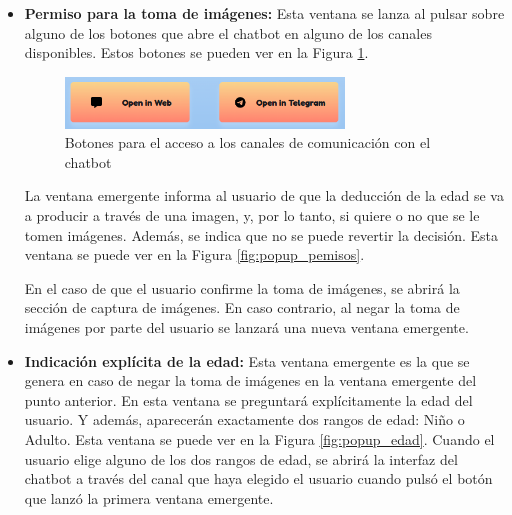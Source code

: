 \begin{itemize}
\item \textbf{Permiso para la toma de imágenes:} Esta ventana se lanza al pulsar sobre alguno de los botones que abre el chatbot en alguno de los canales disponibles. Estos botones se pueden ver en la Figura \ref{fig:botones_canales}.

\begin{figure}[h]
\centering
\includegraphics[width=0.7\textwidth]{imagenes/07_Implementacion/botones_canales.png}
\caption{Botones para el acceso a los canales de comunicación con el chatbot}
\label{fig:botones_canales}
\end{figure}

La ventana emergente informa al usuario de que la deducción de la edad se va a producir a través de una imagen, y, por lo tanto, si quiere o no que se le tomen imágenes. Además, se indica que no se puede revertir la decisión. Esta ventana se puede ver en la Figura \ref{fig:popup_pemisos}.

En el caso de que el usuario confirme la toma de imágenes, se abrirá la sección de captura de imágenes. En caso contrario, al negar la toma de imágenes por parte del usuario se lanzará una nueva ventana emergente.

\item \textbf{Indicación explícita de la edad:} Esta ventana emergente es la que se genera en caso de negar la toma de imágenes en la ventana emergente del punto anterior. En esta ventana se preguntará explícitamente la edad del usuario. Y además, aparecerán exactamente dos rangos de edad: Niño o Adulto. Esta ventana se puede ver en la Figura \ref{fig:popup_edad}. Cuando el usuario elige alguno de los dos rangos de edad, se abrirá la interfaz del chatbot a través del canal que haya elegido el usuario cuando pulsó el botón que lanzó la primera ventana emergente.


\end{itemize}
